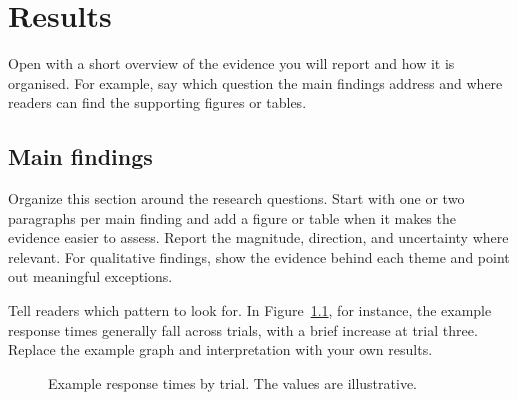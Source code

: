 \chapter{Results}
\label{chap:results}

Open with a short overview of the evidence you will report and how it is organised. For example, say which question the main findings address and where readers can find the supporting figures or tables.

\section{Main findings}
Organize this section around the research questions. Start with one or two paragraphs per main finding and add a figure or table when it makes the evidence easier to assess. Report the magnitude, direction, and uncertainty where relevant. For qualitative findings, show the evidence behind each theme and point out meaningful exceptions.

Tell readers which pattern to look for. In Figure~\ref{fig:example-trend}, for instance, the example response times generally fall across trials, with a brief increase at trial three. Replace the example graph and interpretation with your own results.

\begin{figure}[htbp]
  \centering
  
  \caption{Example response times by trial. The values are illustrative.}
  \label{fig:example-trend}
\end{figure}


